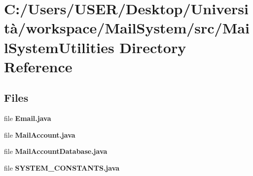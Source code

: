 \section{C\+:/\+Users/\+U\+S\+E\+R/\+Desktop/\+Università/workspace/\+Mail\+System/src/\+Mail\+System\+Utilities Directory Reference}
\label{dir_a01055d736dac56e067cc70212abefcb}
\subsection*{Files}
\begin{DoxyCompactItemize}
\item 
file \textbf{ Email.\+java}
\item 
file \textbf{ Mail\+Account.\+java}
\item 
file \textbf{ Mail\+Account\+Database.\+java}
\item 
file \textbf{ S\+Y\+S\+T\+E\+M\+\_\+\+C\+O\+N\+S\+T\+A\+N\+T\+S.\+java}
\end{DoxyCompactItemize}
